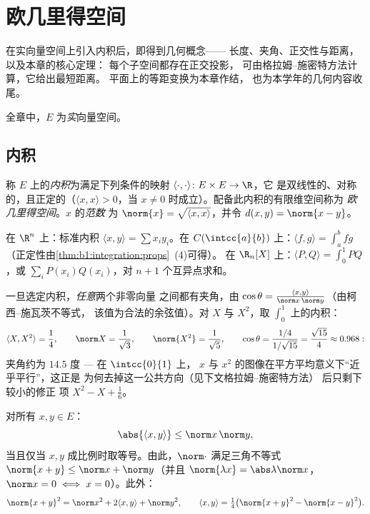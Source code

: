 \chapter{欧几里得空间}\label{ch:b1:euclid}

在实向量空间上引入内积后，即得到几何概念——
长度、夹角、正交性与距离，以及本章的核心定理：
每个子空间都存在正交投影，
可由格拉姆–施密特方法计算，它给出最短距离。
平面上的等距变换为本章作结，
也为本学年的几何内容收尾。

全章中，$E$ 为\emph{实}向量空间。

\section{内积}

\begin{definition}\label{def:b1:euclid:def}
称 $E$ 上的\emph{内积}为满足下列条件的映射
$\langle\cdot,\cdot\rangle \colon E \times E \to \R$，它
是双线性的、对称的，且正定的（$\langle x, x\rangle >
0$，当 $x \neq 0$ 时成立）。配备此内积的有限维空间称为
\emph{欧几里得空间}。$x$ 的\emph{范数}
为 $\norm{x} = \sqrt{\langle x, x\rangle}$，并令 $d(x, y) =
\norm{x - y}$。
\end{definition}

\begin{example}\label{ex:b1:euclid:examples}
在 $\R^n$ 上：标准内积 $\langle x, y\rangle = \sum x_i
y_i$。在 $C(\intcc{a}{b})$ 上：$\langle f, g \rangle = \int_a^b fg$
（正定性由\cref{thm:b1:integration:props}~(4)可得）。
在 $\R_n[X]$ 上：$\langle P, Q\rangle = \int_0^1 PQ$，或 $\sum_{i}
P(x_i)Q(x_i)$，对 $n+1$ 个互异点求和。
\end{example}

\begin{example}[两个多项式之间的夹角]
\label{ex:b1:euclid:polyangle}
一旦选定内积，\emph{任意}两个非零向量
之间都有夹角，由 $\cos\theta = \frac{\langle x,
y\rangle}{\norm x\,\norm y}$（由柯西–施瓦茨不等式，
该值为合法的余弦值）。对 $X$ 与 $X^2$，取 $\int_0^1$ 上的内积：
\[
\langle X, X^2\rangle = \frac14, \qquad
\norm X = \frac1{\sqrt3}, \qquad \norm{X^2} = \frac1{\sqrt5},
\qquad
\cos\theta = \frac{1/4}{1/\sqrt{15}} = \frac{\sqrt{15}}{4}
\approx 0.968 :
\]
夹角约为 $14.5$ 度 --- 在 $\intcc{0}{1}$ 上，
$x$ 与 $x^2$ 的图像在平方平均意义下“近乎平行”，这正是
为何去掉这一公共方向（见下文格拉姆–施密特方法）
后只剩下较小的修正
项 $X^2 - X + \frac16$。
\end{example}

\begin{theorem}\label{thm:b1:euclid:cs}
对所有 $x, y \in E$：
\[
\abs{\langle x, y\rangle} \leq \norm x\, \norm y ,
\]
当且仅当 $x, y$ 成比例时取等号。由此，$\norm\cdot$
满足三角不等式 $\norm{x + y} \leq \norm x + \norm
y$（并且 $\norm{\lambda x} = \abs\lambda \norm x$，$\norm x = 0 \iff
x = 0$）。此外：
\[
\norm{x+y}^2 = \norm x^2 + 2\langle x, y\rangle + \norm y^2,
\qquad
\langle x, y \rangle = \tfrac14\bigl(\norm{x+y}^2 -
\norm{x-y}^2\bigr) .
\]
\end{theorem}

